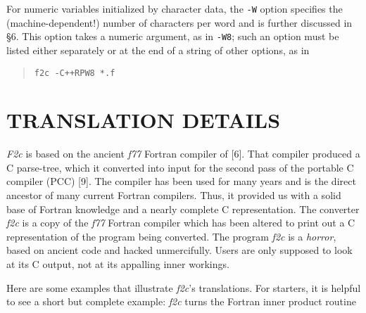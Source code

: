 \documentclass[12pt]{article}
\begin{document}
\noindent
For numeric variables initialized by character data, the \verb|-W| option specifies the (machine-dependent!) number of characters per word and is further discussed in §6. This option takes a numeric argument, as in \verb|-W8|; such an option must be listed either separately or at the end of a string of other options, as in
\begin{quote}
\begin{verbatim}
f2c -C++RPW8 *.f
\end{verbatim}
\end{quote}

\section{TRANSLATION DETAILS}

\emph{F2c} is based on the ancient \emph{f77} Fortran compiler of [6]. That compiler produced a C parse-tree, which it converted into input for the second pass of the portable C compiler (PCC) [9]. The compiler has been used for many years and is the direct ancestor of many current Fortran compilers. Thus, it provided us with a solid base of Fortran knowledge and a nearly complete C representation. The converter \emph{f2c} is a copy of the \emph{f77} Fortran compiler which has been altered to print out a C representation of the program being converted. The program \emph{f2c} is a \emph{horror}, based on ancient code and hacked unmercifully. Users are only supposed to look at its C output, not at its appalling inner workings.

Here are some examples that illustrate \emph{f2c}’s translations. For starters, it is helpful to see a short but complete example: \emph{f2c} turns the Fortran inner product routine
\end{document}
